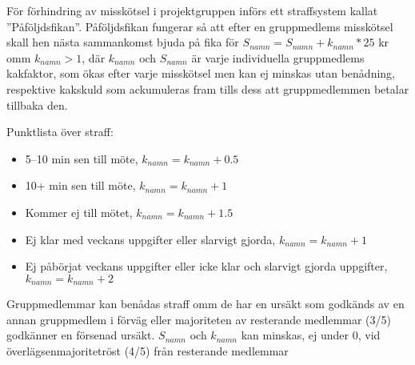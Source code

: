 \documentclass[a4paper]{article}
\begin{document}
För förhindring av misskötsel i projektgruppen införs ett straffsystem kallat ”Påföljdsfikan”. Påföljdsfikan fungerar så att efter en gruppmedlems misskötsel skall hen nästa sammankomst bjuda på fika för $S_{namn} = S_{namn} + k_{namn}*25$ kr omm $k_{namn}>1$, där $k_{namn}$ och $S_{namn}$ är varje individuella gruppmedlems kakfaktor, som ökas efter varje misskötsel men kan ej minskas utan benådning, respektive kakskuld som ackumuleras fram tills dess att gruppmedlemmen betalar tillbaka den.\\ \par
Punktlista över straff:
\begin{itemize}
	\item 5–10 min sen till möte, $k_{namn} = k_{namn} + 0.5$
	\item 10+ min sen till möte, $k_{namn} = k_{namn} + 1$
	\item Kommer ej till mötet, $k_{namn} = k_{namn} + 1.5$
	\item Ej klar med veckans uppgifter eller slarvigt gjorda, $k_{namn} = k_{namn} + 1$
	\item Ej påbörjat veckans uppgifter eller icke klar och slarvigt gjorda uppgifter, \indent $k_{namn} = k_{namn} + 2$
\end{itemize}
\par
Gruppmedlemmar kan benådas straff omm de har en ursäkt som godkänds av en annan gruppmedlem i förväg eller majoriteten av resterande medlemmar (3/5) godkänner en försenad ursäkt. $S_{namn}$ och $k_{namn}$ kan minskas, ej under 0, vid överlägsenmajoritetröst (4/5) från resterande medlemmar



%
%
\end{document}

